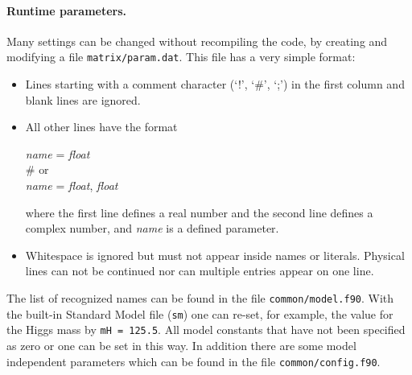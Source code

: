 \documentclass[11pt,a4paper]{refrep}
\begin{document}
\paragraph{Runtime parameters.}
Many settings can be changed without recompiling the code, by
creating and modifying a file \texttt{matrix/param.dat}.
This file has a very simple format:
\begin{itemize}
\item Lines starting with a comment character (`!', `\#', `;')
      in the first column and blank lines are ignored.
\item All other lines have the format
\begin{example}
\textit{name} = \textit{float}\\
\# \textrm{or}\\
\textit{name} = \textit{float}, \textit{float}
\end{example}
      where the first line defines a real number and the second
      line defines a complex number, and \textit{name} is a defined
      parameter.
\item Whitespace is ignored but must not appear inside names or
      literals. Physical lines can not be continued nor can
      multiple entries appear on one line.
\end{itemize}
The list of recognized names can be found in the file
\texttt{common/model.f90}. 
With the built-in Standard Model file (\texttt{sm}) one
can re-set, for example, the value for the Higgs mass by 
{\tt mH = 125.5}.
All model constants that have not been specified as zero or one
can be set in this way. 
In addition there are some model independent parameters which can be found in the file 
\texttt{common/config.f90}.
\end{document}
